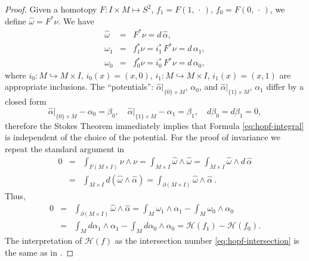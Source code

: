 \documentclass[12pt]{article}
\newcommand{\no}{\noindent}
\begin{document}
\begin{proof}
\no Given a homotopy $F:I\times M\mapsto
S^2$, $f_1=F(1,\,\cdot\,)$, $f_0=F(0,\,\cdot\,)$, we define
$\hat{\omega}=F^\ast\nu$. We have 
\begin{eqnarray*}
\hat{\omega} & = & F^\ast\nu=d\,\hat{\alpha},\\
\omega_1 & = & f_1^\ast\nu=i^\ast_1\,F^\ast\nu=d\,\alpha_1,\\
\omega_0 & = & f_0^\ast\nu=i^\ast_0\,F^\ast\nu=d\,\alpha_0,
\end{eqnarray*}
where $i_0:M\hookrightarrow M\times I$, $i_0(x)=(x,0)$, $i_1:M\hookrightarrow M\times I$, $i_1(x)=(x,1)$
are appropriate inclusions. The ``potentials'': $\hat{\alpha}\bigl|_{\{0\}\times M}$, $\alpha_0$, and $\hat{\alpha}\bigl|_{\{1\}\times M}$, $\alpha_1$ differ  by a closed form 
\[
\hat{\alpha}\bigl|_{\{0\}\times M}-\alpha_0=\beta_0,\quad \hat{\alpha}\bigl|_{\{1\}\times M}-\alpha_1=\beta_1,\quad d\beta_0=d\beta_1=0,
\]
therefore the Stokes Theorem immediately implies that Formula \eqref{eq:hopf-integral} is independent of the choice 
of the potential. For the proof of invariance we repeat the standard argument in \cite[p. 228]{Bott82}
\begin{eqnarray*}
 0 & = & \int_{F(M\times I)} \nu\wedge\nu
 =\int_{M\times I} \hat{\omega}\wedge \hat{\omega} =  \int_{M\times I} \hat{\omega}\wedge d\,\hat{\alpha}\\
 & = &\int_{M\times I} d(\hat{\omega}\wedge \hat{\alpha}) = \int_{\partial(M\times I)} \hat{\omega}\wedge \hat{\alpha}\ .
\end{eqnarray*}
Thus,
\begin{eqnarray*}
0 & = & \int_{\partial(M\times I)} \hat{\omega}\wedge
\hat{\alpha}  =  \int_{M} \omega_1\wedge \alpha_1- \int_{M}
\omega_0\wedge \alpha_0\\
& = & \int_{M} d\alpha_1 \wedge \alpha_1-\int_{M}
d\alpha_0\wedge \alpha_0 =  \mathscr{H}(f_1)-\mathscr{H}(f_0).
\end{eqnarray*}
\no The interpretation of $\mathscr{H}(f)$ as the intersection number \eqref{eq:hopf-intersection} is the same as in \cite[p. 230]{Bott82}.
\end{proof}
\end{document}
